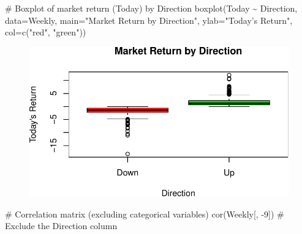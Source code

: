 \documentclass[
]{article}
\newenvironment{Shaded}{\begin{snugshade}}{\end{snugshade}}
\newcommand{\AttributeTok}[1]{\textcolor[rgb]{0.40,0.45,0.13}{#1}}
\newcommand{\CommentTok}[1]{\textcolor[rgb]{0.37,0.37,0.37}{#1}}
\newcommand{\DecValTok}[1]{\textcolor[rgb]{0.68,0.00,0.00}{#1}}
\newcommand{\FunctionTok}[1]{\textcolor[rgb]{0.28,0.35,0.67}{#1}}
\newcommand{\NormalTok}[1]{\textcolor[rgb]{0.00,0.23,0.31}{#1}}
\newcommand{\SpecialCharTok}[1]{\textcolor[rgb]{0.37,0.37,0.37}{#1}}
\newcommand{\StringTok}[1]{\textcolor[rgb]{0.13,0.47,0.30}{#1}}
\begin{document}
\begin{Shaded}
\begin{Highlighting}[]
\CommentTok{\# Boxplot of market return (Today) by Direction}
\FunctionTok{boxplot}\NormalTok{(Today }\SpecialCharTok{\textasciitilde{}}\NormalTok{ Direction, }\AttributeTok{data=}\NormalTok{Weekly, }\AttributeTok{main=}\StringTok{"Market Return by Direction"}\NormalTok{, }\AttributeTok{ylab=}\StringTok{"Today’s Return"}\NormalTok{, }\AttributeTok{col=}\FunctionTok{c}\NormalTok{(}\StringTok{"red"}\NormalTok{, }\StringTok{"green"}\NormalTok{))}
\end{Highlighting}
\end{Shaded}

\begin{figure}[H]

{\centering \includegraphics{hw2_files/figure-pdf/unnamed-chunk-4-2.pdf}

}

\end{figure}

\begin{Shaded}
\begin{Highlighting}[]
\CommentTok{\# Correlation matrix (excluding categorical variables)}
\FunctionTok{cor}\NormalTok{(Weekly[, }\SpecialCharTok{{-}}\DecValTok{9}\NormalTok{])  }\CommentTok{\# Exclude the Direction column}
\end{Highlighting}
\end{Shaded}
\end{document}
